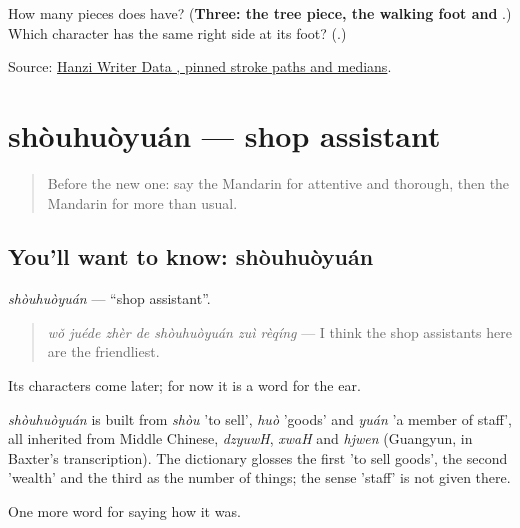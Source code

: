\begin{tcolorbox}[breakable,colback=teal!4,colframe=teal!35!black,title={Before you move on}]
How many pieces does  have? (\textbf{Three: the tree piece, the walking foot and }.) Which character has the same right side at its foot? (\textbf{}.)

Source: \href{https://raw.githubusercontent.com/chanind/hanzi-writer-data/68d10a4b21150cae5e1ebbd223eed289cf32d90c/data/\%E6\%A0\%BC.json}{Hanzi Writer Data , pinned stroke paths and medians}.
\end{tcolorbox}
\section[shòuhuòyuán]{shòuhuòyuán — shop assistant}

\label{lesson:ZH-C525-shouhuoyuan}



\begin{quote}
Before the new one: say the Mandarin for attentive and thorough, then the Mandarin for more than usual.
\end{quote}

\subsection*{You'll want to know: shòuhuòyuán}
\emph{shòuhuòyuán} — \textquotedblleft{}shop assistant\textquotedblright{}.

\begin{quote}
\emph{wǒ juéde zhèr de shòuhuòyuán zuì rèqíng} — I think the shop assistants here are the friendliest.
\end{quote}

Its characters come later; for now it is a word for the ear.

\begin{cousinweb}
\emph{shòuhuòyuán} is built from \emph{shòu} 'to sell', \emph{huò} 'goods' and \emph{yuán} 'a member of staff', all inherited from Middle Chinese, \emph{dzyuwH}, \emph{xwaH} and \emph{hjwen} (Guangyun, in Baxter's transcription). The dictionary glosses the first 'to sell goods', the second 'wealth' and the third as the number of things; the sense 'staff' is not given there.
\end{cousinweb}

\begin{grammarlens}[title={What you've built}]
One more word for saying how it was.
\end{grammarlens}

